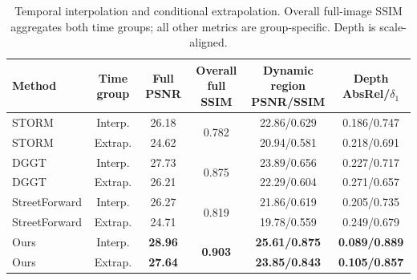 \begin{table}[H]
\centering\small
\setlength{\tabcolsep}{4pt}
\caption{Temporal interpolation and conditional extrapolation. Overall full-image SSIM aggregates both time groups; all other metrics are group-specific. Depth is scale-aligned.}
\label{tab:temporal-groups}
\begin{tabular}{@{}lccccc@{}}
\toprule
Method & Time group & Full PSNR & Overall full SSIM & \shortstack{Dynamic region\\PSNR/SSIM} & \shortstack{Depth\\AbsRel/$\delta_1$} \\
\midrule
STORM & Interp. & 26.18 & \multirow{2}{*}{0.782} & 22.86/0.629 & 0.186/0.747 \\
STORM & Extrap. & 24.62 &  & 20.94/0.581 & 0.218/0.691 \\
DGGT & Interp. & 27.73 & \multirow{2}{*}{0.875} & 23.89/0.656 & 0.227/0.717 \\
DGGT & Extrap. & 26.21 &  & 22.29/0.604 & 0.271/0.657 \\
StreetForward & Interp. & 26.27 & \multirow{2}{*}{0.819} & 21.86/0.619 & 0.205/0.735 \\
StreetForward & Extrap. & 24.71 &  & 19.78/0.559 & 0.249/0.679 \\
Ours & Interp. & \textbf{28.96} & \multirow{2}{*}{\textbf{0.903}} & \textbf{25.61/0.875} & \textbf{0.089/0.889} \\
Ours & Extrap. & \textbf{27.64} &  & \textbf{23.85/0.843} & \textbf{0.105/0.857} \\
\bottomrule
\end{tabular}
\end{table}
